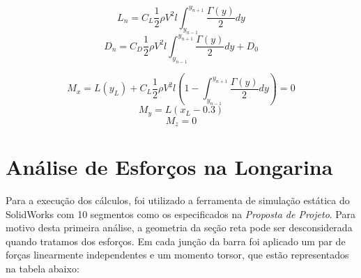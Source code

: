 \documentclass[a4paper]{article}
\begin{document}
\begin{minipage}{.47\linewidth}
    \begin{equation}
        L_n = C_L \frac{1}{2} \rho V^2 l \int_{y_{n-1}}^{y_{n+1}} \frac{\Gamma(y)}{2} dy
    \end{equation}
    \begin{equation}
        D_n = C_D \frac{1}{2} \rho V^2 l \int_{y_{n-1}}^{y_{n+1}} \frac{\Gamma(y)}{2} dy + D_0
    \end{equation}
\end{minipage}
\begin{minipage}{.47\linewidth}
    \begin{equation}
        M_x = L (y_L) + C_L \frac{1}{2} \rho V^2 l (1 - \int_{y_{n-1}}^{y_{n+1}} \frac{\Gamma(y)}{2} dy) = 0
    \end{equation}
    \begin{equation}
        M_y = L (x_L - 0.3)
    \end{equation}
    \begin{equation}
        M_z = 0
    \end{equation}
\end{minipage}

\vspace{0.5cm}

\section{Análise de Esforços na Longarina}

Para a execução dos cálculos, foi utilizado a ferramenta de simulação estática do SolidWorks com 10 segmentos como os especificados na \textit{Proposta de Projeto}. Para motivo desta primeira análise, a geometria da seção reta pode ser desconsiderada quando tratamos dos esforços. Em cada junção da barra foi aplicado um par de forças linearmente independentes e um momento torsor, que estão representados na tabela abaixo:
\end{document}

